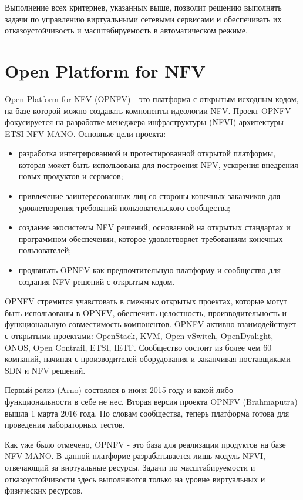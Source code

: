 \documentclass[oneside,final,14pt,a4paper]{extreport}
\begin{document}
Выполнение всех критериев, указанных выше, позволит решению выполнять задачи по управлению виртуальными сетевыми сервисами и обеспечивать их отказоустойчивость и масштабируемость в автоматическом режиме.


\section{Open Platform for NFV}
Open Platform for NFV (OPNFV) - это платформа с открытым исходным кодом, на базе которой можно создавать компоненты  идеологии NFV. Проект OPNFV фокусируется на разработке менеджера инфраструктуры (NFVI) архитектуры ETSI NFV MANO\cite{opnfv-official}. Основные цели проекта:
\begin{itemize}
	\item разработка интегрированной и протестированной открытой платформы, которая может быть использована для построения NFV, ускорения внедрения новых продуктов и сервисов;
	\item привлечение заинтересованных лиц со стороны конечных заказчиков для удовлетворения требований пользовательского сообщества;
	\item создание экосистемы NFV решений, основанной на открытых стандартах и программном обеспечении, которое удовлетворяет требованиям конечных пользователей;
	\item продвигать OPNFV как предпочтительную платформу и сообщество для создания NFV решений с открытым кодом.
\end{itemize}

OPNFV стремится учавстовать в смежных открытых проектах, которые могут быть использованы в OPNFV, обеспечить целостность, производительность и функциональную совместимость компонентов. OPNFV активно взаимодействует с открытыми проектами: OpenStack, KVM, Open vSwitch, OpenDyalight, ONOS, Open Contrail, ETSI, IETF. Сообщество состоит из более чем 60 компаний, начиная с производителей оборудования и заканчивая поставщиками SDN и NFV решений.\cite{opnfv-state1}

Первый релиз (Arno) состоялся в июня 2015 году и какой-либо функциональности в себе не нес. Вторая версия проекта OPNFV (Brahmaputra) вышла 1 марта 2016 года. По словам сообщества, теперь платформа готова для проведения лабораторных тестов.

Как уже было отмечено, OPNFV - это база для реализации продуктов на базе NFV MANO. В данной платформе разрабатывается лишь модуль NFVI, отвечающий за виртуальные ресурсы. Задачи по масштабируемости и отказоустойчивости здесь выполняются только на уровне виртуальных и физических ресурсов.
\end{document}
